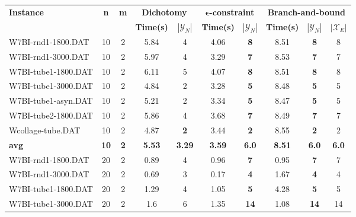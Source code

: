 \begin{table}[h]
\centering
\hspace*{-1cm}\begin{tabular}{lccccccccc}
\toprule
\textbf{Instance} & \textbf{n} & \textbf{m} & \multicolumn{2}{c}{\textbf{Dichotomy}} & \multicolumn{2}{c}{\textbf{$\mathbf{\epsilon}$-constraint}}  & \multicolumn{3}{c}{\textbf{Branch-and-bound}}
\\
\cmidrule(r){4-5} \cmidrule(r){6-7} \cmidrule(r){8-10}
~ & ~ & ~ & \textbf{Time(s)} & \textbf{$|\mathcal{Y}_N|$} & \textbf{Time(s)} & \textbf{$|\mathcal{Y}_N|$} & \textbf{Time(s)} & \textbf{$|\mathcal{Y}_N|$} & \textbf{$|\mathcal{X}_E|$} \\
\midrule

W7BI-rnd1-1800.DAT & 10 & 2 & 5.84 & 4 &  \textcolor{blue2}{4.06} &  \textbf{8} & 8.51 &  \textbf{8}  & 8 \\
W7BI-rnd1-3000.DAT & 10 & 2 & 5.97 & 4 &  \textcolor{blue2}{3.29} &  \textbf{7} & 8.53 &  \textbf{7}  & 7 \\
W7BI-tube1-1800.DAT & 10 & 2 & 6.11 & 5 &  \textcolor{blue2}{4.07} &  \textbf{8} & 8.51 &  \textbf{8}  & 8 \\
W7BI-tube1-3000.DAT & 10 & 2 & 4.84 & 2 &  \textcolor{blue2}{3.28} &  \textbf{5} & 8.48 &  \textbf{5}  & 5 \\
W7BI-tube1-asyn.DAT & 10 & 2 & 5.21 & 2 &  \textcolor{blue2}{3.34} &  \textbf{5} & 8.47 &  \textbf{5}  & 5 \\
W7BI-tube2-1800.DAT & 10 & 2 & 5.86 & 4 &  \textcolor{blue2}{3.68} &  \textbf{7} & 8.49 &  \textbf{7}  & 7 \\
Wcollage-tube.DAT & 10 & 2 & 4.87 &  \textbf{2} &  \textcolor{blue2}{3.44} &  \textbf{2} & 8.55 &  \textbf{2}  & 2 \\
\cline{1-10} \textbf{avg} & \textbf{10} & \textbf{2} & \textbf{5.53} & \textbf{3.29} & \textbf{3.59} & \textbf{6.0} & \textbf{8.51} & \textbf{6.0} & \textbf{6.0} \\ \cline{1-10}
W7BI-rnd1-1800.DAT & 20 & 2 &  \textcolor{blue2}{0.89} & 4 & 0.96 &  \textbf{7} & 0.95 &  \textbf{7}  & 7 \\
W7BI-rnd1-3000.DAT & 20 & 2 & 0.69 & 3 &  \textcolor{blue2}{0.17} &  \textbf{4} & 1.67 &  \textbf{4}  & 4 \\
W7BI-tube1-1800.DAT & 20 & 2 & 1.29 & 4 &  \textcolor{blue2}{1.05} &  \textbf{5} & 4.28 &  \textbf{5}  & 5 \\
W7BI-tube1-3000.DAT & 20 & 2 & 1.6 & 6 & 1.35 &  \textbf{14} &  \textcolor{blue2}{1.08} &  \textbf{14}  & 14 \\

\end{tabular}
\end{table}
